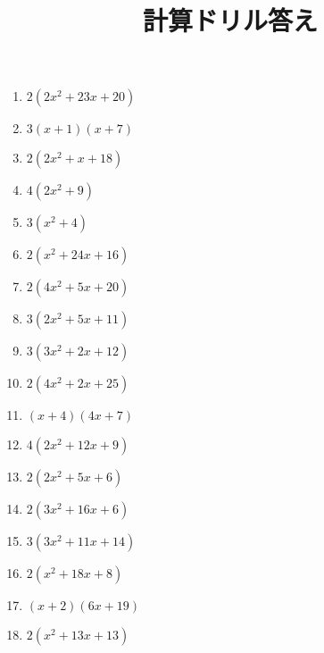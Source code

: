 \documentclass[9pt,dvipdfmx,a4paper]{article}
\begin{document}
    
\title{計算ドリル答え} 
\date{} 
\maketitle
\begin{multicols}{2}
 \begin{enumerate}

\item
$ 2 \left(2 x^{2} + 23 x + 20\right)$

\item
$ 3 \left(x + 1\right) \left(x + 7\right)$

\item
$ 2 \left(2 x^{2} + x + 18\right)$

\item
$ 4 \left(2 x^{2} + 9\right)$

\item
$ 3 \left(x^{2} + 4\right)$

\item
$ 2 \left(x^{2} + 24 x + 16\right)$

\item
$ 2 \left(4 x^{2} + 5 x + 20\right)$

\item
$ 3 \left(2 x^{2} + 5 x + 11\right)$

\item
$ 3 \left(3 x^{2} + 2 x + 12\right)$

\item
$ 2 \left(4 x^{2} + 2 x + 25\right)$

\item
$ \left(x + 4\right) \left(4 x + 7\right)$

\item
$ 4 \left(2 x^{2} + 12 x + 9\right)$

\item
$ 2 \left(2 x^{2} + 5 x + 6\right)$

\item
$ 2 \left(3 x^{2} + 16 x + 6\right)$

\item
$ 3 \left(3 x^{2} + 11 x + 14\right)$

\item
$ 2 \left(x^{2} + 18 x + 8\right)$

\item
$ \left(x + 2\right) \left(6 x + 19\right)$

\item
$ 2 \left(x^{2} + 13 x + 13\right)$


\end{enumerate}
\end{multicols}
\end{document}
